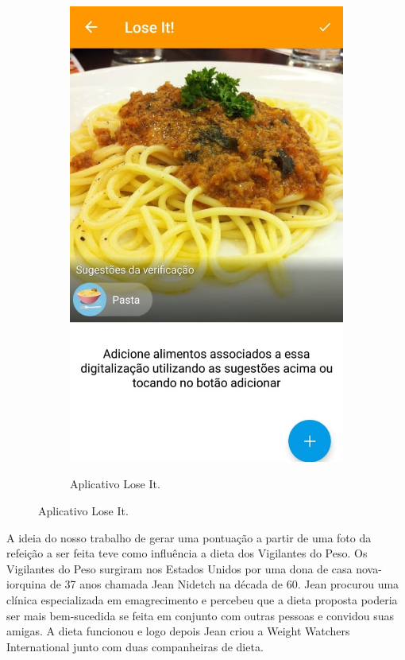 \begin{figure}[!ht]
\begin{subfigure}{0.4\textwidth}
  \label{fig:subApps1}
\end{subfigure}%
\hspace{.1\textwidth}
\begin{subfigure}{0.4\textwidth}
  \centering
    \caption{Aplicativo Lose It.}
  \includegraphics[width=\textwidth]{imgs/loseit.jpeg}
  \label{fig:subApps2}
\end{subfigure}

\label{fig:test}
\end{figure}

A ideia do nosso trabalho de gerar uma pontuação a partir de uma foto da refeição a ser feita teve como influência a dieta dos Vigilantes do Peso. Os Vigilantes do Peso surgiram nos Estados Unidos por uma dona de casa nova-iorquina de 37 anos chamada Jean Nidetch na década de 60. Jean procurou uma clínica especializada em emagrecimento e percebeu que a dieta proposta poderia ser mais bem-sucedida se feita em conjunto com outras pessoas e convidou suas amigas. A dieta funcionou e logo depois Jean criou a Weight Watchers International junto com duas companheiras de dieta.

